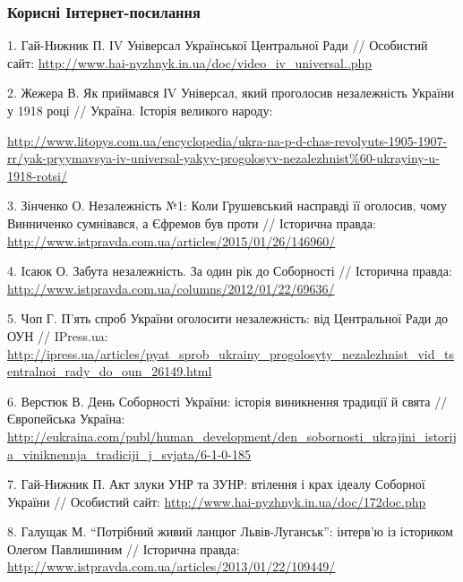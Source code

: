  
 
 
 
 

\subsubsection{Корисні Інтернет-посилання}

1. Гай-Нижник П. ІV Універсал Української Центральної Ради // Особистий сайт:
\url{http://www.hai-nyzhnyk.in.ua/doc/video_iv_universal..php}

2. Жежера В. Як приймався ІV Універсал, який проголосив незалежність України у
1918 році // Україна. Історія великого народу: 

\url{http://www.litopys.com.ua/encyclopedia/ukra-na-p-d-chas-revolyuts-1905-1907-rr/yak-pryymavsya-iv-universal-yakyy-progolosyv-nezalezhnist%60-ukrayiny-u-1918-rotsi/}

3. Зінченко О. Незалежність №1: Коли Грушевський насправді її оголосив, чому
Винниченко сумнівався, а Єфремов був проти // Історична правда:
\url{http://www.istpravda.com.ua/articles/2015/01/26/146960/}

4. Ісаюк О.  Забута незалежність. За один рік до Соборності // Історична
правда: \url{http://www.istpravda.com.ua/columns/2012/01/22/69636/}

5. Чоп Г. П'ять спроб України оголосити незалежність: від Центральної Ради до
ОУН // IPress.ua: \url{http://ipress.ua/articles/pyat_sprob_ukrainy_progolosyty_nezalezhnist_vid_tsentralnoi_rady_do_oun_26149.html}

6. Верстюк В. День Соборності України: історія виникнення традиції й свята //
Європейська Україна: \url{http://eukraina.com/publ/human_development/den_sobornosti_ukrajini_istorija_viniknennja_tradiciji_j_svjata/6-1-0-185}

7. Гай-Нижник П. Акт злуки УНР та ЗУНР: втілення і крах ідеалу Соборної України
// Особистий сайт: \url{http://www.hai-nyzhnyk.in.ua/doc/172doc.php}

8. Галущак М. \enquote{Потрібний живий ланцюг Львів-Луганськ}: інтерв'ю із істориком
Олегом Павлишиним // Історична правда: \url{http://www.istpravda.com.ua/articles/2013/01/22/109449/}

